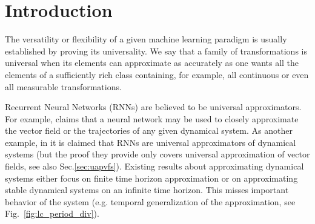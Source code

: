 \documentclass{article}
\theoremstyle{definition} \newtheorem{definition}{Definition}
\theoremstyle{remark} \newtheorem{remark}{Remark}
\newcounter{ct}
\begin{document}



\section{Introduction}
The versatility or flexibility of a given machine learning paradigm is usually established by proving its universality.
We say that a family of transformations is universal when its elements can approximate as accurately as one wants all the elements of a sufficiently rich class containing, for example, all continuous or even all measurable transformations.


Recurrent Neural Networks (RNNs) are believed to be universal approximators.
For example, \citet{durstewitz2023reconstructing} claims that 
 a neural network may be used to closely approximate the vector field or the trajectories of any given dynamical system.
As another example, in \citep{dinc2025latentcomputing} it is claimed that RNNs are universal approximators of dynamical systems (but the proof they provide only covers universal approximation of vector fields, see also Sec.\ref{sec:uapvfs}). 
Existing results about approximating dynamical systems either focus on finite time horizon approximation or on approximating stable dynamical systems on an infinite time horizon.
This misses important behavior of the system (e.g. temporal generalization of the approximation, see Fig.~\ref{fig:lc_period_div}).
\end{document}
